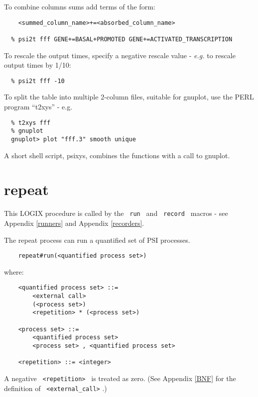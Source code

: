 \noindent
To combine columns sums add terms of the form:

\begin{verbatim}
    <summed_column_name>+=<absorbed_column_name>

  % psi2t fff GENE+=BASAL+PROMOTED GENE+=ACTIVATED_TRANSCRIPTION
\end{verbatim}

\noindent
To rescale the output times, specify a negative rescale value - {\em e.g.}
to rescale output times by 1/10:
\begin{verbatim}
  % psi2t fff -10
\end{verbatim}

\noindent
To split the table into multiple 2-column files, suitable for gnuplot,
use the PERL program ``t2xys'' - e.g.

\begin{verbatim}
  % t2xys fff
  % gnuplot
  gnuplot> plot "fff.3" smooth unique
\end{verbatim}

\noindent
A short shell script, psixys, combines the functions with a call to gnuplot.

\section{repeat}
\label{repeat}
This LOGIX procedure is called by the \verb+ run + and
\verb+ record + macros - see Appendix \ref{runners} and
Appendix \ref{recorders}.

\noindent
The repeat process can run a quantified set of PSI
processes.

\begin{verbatim}
    repeat#run(<quantified process set>)
\end{verbatim}

\noindent
where:

\begin{verbatim}
    <quantified process set> ::=
        <external call>
        (<process set>)
        <repetition> * (<process set>)

    <process set> ::=
        <quantified process set>
        <process set> , <quantified process set>

    <repetition> ::= <integer>
\end{verbatim}

\noindent
A negative \verb+ <repetition> + is treated as zero.
\noindent
(See Appendix \ref{BNF} for the definition of \verb+ <external_call>+ .)

